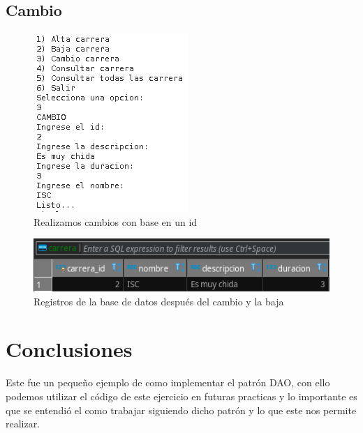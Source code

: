 \documentclass[a4paper,12pt]{article}
\begin{document}
\subsection{Cambio}
\begin{figure}[H]
\begin{center}
 \includegraphics[width=\textwidth]{cambio.png}
 \caption{Realizamos cambios con base en un id}
 \label{fig:cambio}
\end{center}
\end{figure}

\begin{figure}[H]
\begin{center}
 \includegraphics[width=\textwidth]{final.png}
 \caption{Registros de la base de datos después del cambio y la baja}
 \label{fig:final}
\end{center}
\end{figure}


\section{Conclusiones}
Este fue un pequeño ejemplo de como implementar el patrón DAO, con ello podemos 
utilizar el código de este ejercicio en futuras practicas y lo importante es 
que se entendió el como trabajar siguiendo dicho patrón y lo que este nos 
permite realizar.
\end{document}
